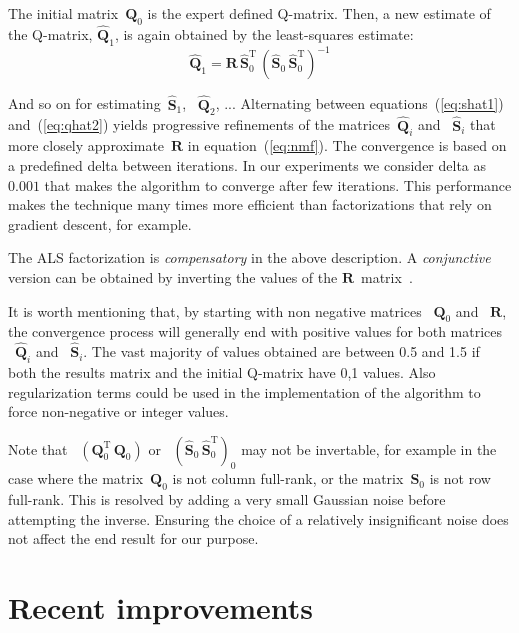 The initial matrix~$\mathbf{{Q}}_0$ is the expert defined Q-matrix. Then, a new estimate of the Q-matrix, $\mathbf{\hat{Q}}_1$, is again obtained by the least-squares estimate:
\begin{equation}
  \mathbf{\hat{Q}}_1 = \mathbf{R} \, \mathbf{\hat{S}}_0^{\mathrm{T}} \, (\mathbf{\hat{S}}_0 \, \mathbf{\hat{S}}_0^{\mathrm{T}})^{-1} \label{eq:qhat2}
\end{equation}

And so on for estimating~$\mathbf{\hat{S}}_1$, ~$\mathbf{\hat{Q}}_2$, ... Alternating between equations~(\ref{eq:shat1}) and~(\ref{eq:qhat2}) yields progressive refinements of the matrices~$\mathbf{\hat{Q}}_i$ and ~$\mathbf{\hat{S}}_i$ that more closely approximate~$\mathbf{R}$ in equation~(\ref{eq:nmf}).  The convergence is based on a predefined delta between iterations. In our experiments we consider delta as $0.001$ that makes the algorithm to converge after few iterations. This performance makes the technique many times more efficient than factorizations that rely on gradient descent, for example.

The ALS factorization is \textit{compensatory} in the above description.  A \textit{conjunctive} version can be obtained by inverting the values of the $\mathbf{R}$~matrix~\citep{Desmarais2012b}.  

It is worth mentioning that, by starting with non negative matrices ~$\mathbf{{Q}}_0$ and ~$\mathbf{R}$, the convergence process will generally end with positive values for both matrices ~$\mathbf{\hat{Q}}_i$ and ~$\mathbf{\hat{S}}_i$. The vast majority of values obtained are between 0.5 and 1.5 if both the results matrix and the initial Q-matrix have {0,1} values. Also regularization terms could be used in the implementation of the algorithm to force non-negative or integer values.

Note that ~$(\mathbf{Q}_0^{\mathrm{T}} \, \mathbf{Q}_0)$ or ~$(\mathbf{\hat{S}}_0 \,\mathbf{\hat{S}}_0^{\mathrm{T}})_0$ may not be invertable, for example in the case where the matrix~$\mathbf{Q}_0$ is not column full-rank, or the matrix~$\mathbf{S}_0$ is not row full-rank.  This is resolved by adding a very small Gaussian noise before attempting the inverse.  Ensuring the choice of a relatively insignificant noise does not affect the end result for our purpose. 


\section{Recent improvements}

